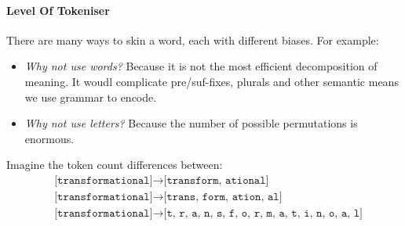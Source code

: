 
\paragraph{Level Of Tokeniser}
There are many ways to skin a word, each with different biases. 
For example:
\begin{itemize}
    \item \textit{Why not use words?}
    Because it is not the most efficient decomposition of meaning. 
    It woudl complicate pre/suf-fixes, plurals and other semantic means we use grammar to encode. 
    \item  \textit{Why not use letters?}
    Because the number of possible permutations is enormous.
\end{itemize}

Imagine the token count differences between:
\begin{align}
    & \texttt{[transformational]} \rightarrow \texttt{[transform, ational]} \\
    & \texttt{[transformational]} \rightarrow \texttt{[trans, form, ation, al]} \\
    & \texttt{[transformational]} \rightarrow \texttt{[t, r, a, n, s, f, o, r, m, a, t, i, n, o, a, l]}
\end{align}

